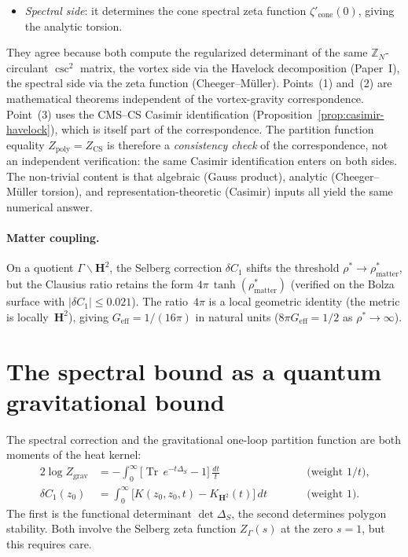 \begin{proposition}
\begin{itemize}
  giving the transcendental part of~$b(N)$;
\item \emph{Spectral side}: it determines the cone spectral
  zeta function $\zeta'_{\mathrm{cone}}(0)$, giving the
  analytic torsion.
\end{itemize}
They agree because both compute the regularized determinant
of the same $\mathbb{Z}_N$-circulant $\csc^2$ matrix, the
vortex side via the Havelock decomposition (Paper~I),
the spectral side via the zeta function
(Cheeger--M\"uller).
Points~(1) and~(2) are mathematical theorems
independent of the vortex-gravity correspondence.
Point~(3) uses the CMS--CS Casimir identification
(Proposition~\ref{prop:casimir-havelock}), which is
itself part of the correspondence.  The partition
function equality $Z_{\mathrm{poly}} = Z_{\mathrm{CS}}$
is therefore a \emph{consistency check} of the
correspondence, not an independent verification:
the same Casimir identification enters on both sides.
The non-trivial content is that algebraic (Gauss
product), analytic (Cheeger--M\"uller torsion), and
representation-theoretic (Casimir) inputs all yield
the same numerical answer.
\end{proposition}

\paragraph{Matter coupling.}
On a quotient $\Gamma\backslash\mathbf{H}^2$, the Selberg
correction $\delta C_1$ shifts the threshold
$\rho^* \to \rho^*_{\mathrm{matter}}$, but the Clausius ratio
retains the form $4\pi\,\tanh(\rho^*_{\mathrm{matter}})$
(verified on the Bolza surface with $|\delta C_1| \le 0.021$).
The ratio~$4\pi$ is a local geometric identity (the metric is
locally~$\mathbf{H}^2$), giving
$G_{\mathrm{eff}} = 1/(16\pi)$ in natural units
($8\pi G_{\mathrm{eff}} = 1/2$ as $\rho^* \to \infty$).


\section{The spectral bound as a quantum gravitational bound}
\label{sec:spectral-bound}

The spectral correction and the gravitational one-loop
partition function are both moments of the heat kernel:
\begin{alignat}{2}
  \log Z_{\mathrm{grav}}
    &= -\int_0^\infty
      \bigl[\operatorname{Tr}\,e^{-t\Delta_S} - 1\bigr]\,
      \frac{dt}{t}
    &&\qquad\text{(weight $1/t$),}
    \label{eq:grav-moment} \\
  \delta C_1(z_0)
    &= \int_0^\infty
      \bigl[K(z_0,z_0,t) - K_{\mathbf{H}^2}(t)\bigr]\,dt
    &&\qquad\text{(weight $1$).}
    \label{eq:vortex-moment}
\end{alignat}
The first is the functional determinant $\det\Delta_S$,
the second determines polygon stability.
Both involve the Selberg zeta function $Z_\Gamma(s)$
at the zero $s = 1$, but this requires care.

